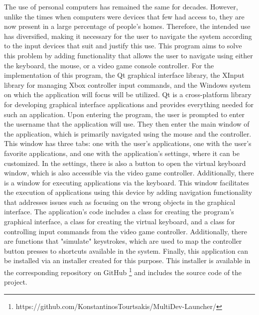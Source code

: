 







The use of personal computers has remained the same for decades. However, unlike the times when 
computers were devices that few had access to, they are now present in a large percentage of 
people's homes. Therefore, the intended use has diversified, making it necessary for the user 
to navigate the system according to the input devices that suit and justify this use. This 
program aims to solve this problem by adding functionality that allows the user to navigate 
using either the keyboard, the mouse, or a video game console controller. For the implementation 
of this program, the Qt graphical interface library, the XInput library for managing Xbox 
controller input commands, and the Windows system on which the application will focus will be 
utilized. Qt is a cross-platform library for developing graphical interface applications and 
provides everything needed for such an application. Upon entering the program, the user is 
prompted to enter the username that the application will use. They then enter the main window 
of the application, which is primarily navigated using the mouse and the controller. This window 
has three tabs: one with the user's applications, one with the user's favorite applications, and 
one with the application's settings, where it can be customized. In the settings, there is also 
a button to open the virtual keyboard window, which is also accessible via the video game controller. 
Additionally, there is a window for executing applications via the keyboard. This window facilitates 
the execution of applications using this device by adding navigation functionality that addresses 
issues such as focusing on the wrong objects in the graphical interface. The application's code 
includes a class for creating the program's graphical interface, a class for creating the virtual 
keyboard, and a class for controlling input commands from the video game controller. Additionally, 
there are functions that "simulate" keystrokes, which are used to map the controller button presses 
to shortcuts available in the system. Finally, this application can be installed via an installer 
created for this purpose. This installer is available in the corresponding repository on 
GitHub \footnote{https://github.com/KonstantinosTourtsakis/MultiDev-Launcher/} and includes the source 
code of the project.